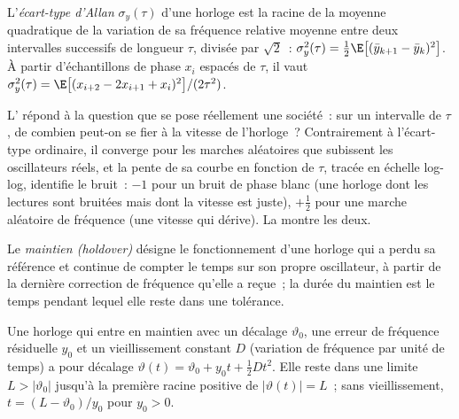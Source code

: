 \begin{definition}\label{def:nw:time-synchronisation:adev}
L'\emph{écart-type d'Allan} $\sigma_y(\tau)$ d'une horloge est la racine de la moyenne quadratique de la
variation de sa fréquence relative moyenne entre deux intervalles successifs de longueur $\tau$, divisée par $\sqrt2$~:
$\sigma_y^2(\tau) = \tfrac12 \E\bigl[(\bar y_{k+1} - \bar y_k)^2\bigr]$. À partir d'échantillons de phase $x_i$ espacés de $\tau$, il
vaut $\sigma_y^2(\tau) = \E\bigl[(x_{i+2} - 2x_{i+1} + x_i)^2\bigr] / (2\tau^2)$.
\end{definition}

L' répond à la question que se pose réellement une société~: sur un intervalle de $\tau$, de combien peut-on se
fier à la vitesse de l'horloge~? Contrairement à l'écart-type ordinaire, il converge pour les marches aléatoires que subissent les
oscillateurs réels, et la pente de sa courbe en fonction de $\tau$, tracée en échelle log-log, identifie le bruit~: $-1$ pour un bruit de phase blanc (une horloge dont les lectures sont bruitées mais dont la vitesse est juste), $+\tfrac12$ pour une marche
aléatoire de fréquence (une vitesse qui dérive). La  montre les deux.

\begin{definition}\label{def:nw:time-synchronisation:holdover}
Le \emph{maintien (holdover)} désigne le fonctionnement d'une horloge qui a perdu sa référence et continue de compter le temps sur son propre oscillateur, à partir
de la dernière correction de fréquence qu'elle a reçue~; la durée du maintien est le temps pendant lequel elle reste dans une tolérance.
\end{definition}

\begin{proposition}\label{prop:nw:time-synchronisation:holdover}
Une horloge qui entre en maintien avec un décalage $\vartheta_0$, une erreur de fréquence résiduelle $y_0$ et un vieillissement constant $D$ (variation de fréquence
par unité de temps) a pour décalage $\vartheta(t) = \vartheta_0 + y_0 t + \tfrac12 D t^2$. Elle reste dans une limite $L > |\vartheta_0|$ jusqu'à la
première racine positive de $|\vartheta(t)| = L$~; sans vieillissement, $t = (L - \vartheta_0)/y_0$ pour $y_0 > 0$.
\end{proposition}

